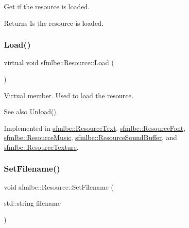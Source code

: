 Get if the resource is loaded. 

\begin{DoxyReturn}{Returns}
Is the resource is loaded. 
\end{DoxyReturn}
\mbox{\label{classsfmlbe_1_1_resource_a35981869a1e90ebbf30258ff7aa1d6d2}} 
\subsubsection{\texorpdfstring{Load()}{Load()}}
{\footnotesize\ttfamily virtual void sfmlbe\+::\+Resource\+::\+Load (\begin{DoxyParamCaption}{ }\end{DoxyParamCaption})\hspace{0.3cm}{\ttfamily [pure virtual]}}



Virtual member. Used to load the resource. 

\begin{DoxySeeAlso}{See also}
\mbox{\hyperlink{classsfmlbe_1_1_resource_a48c75a88679cf457965dd013f47014b9}{Unload()}} 
\end{DoxySeeAlso}


Implemented in \mbox{\hyperlink{classsfmlbe_1_1_resource_text_a1176965f3e9d26c618688f7899b4b58b}{sfmlbe\+::\+Resource\+Text}}, \mbox{\hyperlink{classsfmlbe_1_1_resource_font_a8629842a4597fa4c22e58a85ae76bc74}{sfmlbe\+::\+Resource\+Font}}, \mbox{\hyperlink{classsfmlbe_1_1_resource_music_a8d612eff1f1f8847c2b96a616456e558}{sfmlbe\+::\+Resource\+Music}}, \mbox{\hyperlink{classsfmlbe_1_1_resource_sound_buffer_a1207531bb0e5355f90cf4a7f67734555}{sfmlbe\+::\+Resource\+Sound\+Buffer}}, and \mbox{\hyperlink{classsfmlbe_1_1_resource_texture_a4f8d27c8e50efce6d66a30edb078e2d3}{sfmlbe\+::\+Resource\+Texture}}.

\mbox{\label{classsfmlbe_1_1_resource_a219b033dc969ca0860bf7402da27107d}} 
\subsubsection{\texorpdfstring{Set\+Filename()}{SetFilename()}}
{\footnotesize\ttfamily void sfmlbe\+::\+Resource\+::\+Set\+Filename (\begin{DoxyParamCaption}\item[{std\+::string}]{filename }\end{DoxyParamCaption})\hspace{0.3cm}{\ttfamily [inline]}}



